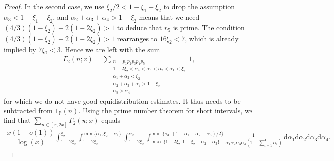 \documentclass{amsart}
\numberwithin{equation}{section}
\begin{document}
\begin{proof}
\medskip
In the second case, we use $\xi_2/2 < 1-\xi_1-\xi_2$ to drop the assumption $\alpha_3 < 1-\xi_1-\xi_2$, and    $\alpha_2+\alpha_3+\alpha_4 > 1-\xi_2$ means that we need $(4/3)(1-\xi_2)+2(1-2\xi_2) >1$
to deduce that $n_5$ is prime. The condition $(4/3)(1-\xi_2)+2(1-2\xi_2) >1$ rearranges to
$  16\xi_2 < 7
$, which is already implied by $ 7 \xi_2 < 3.$ Hence we are left with the sum 
\begin{align}\label{equ:decpart1}
\Gamma_2(n;x)= \sum_{\substack{ n = p_1p_2p_3p_4p_5 \\ 1-2\xi_2 < \alpha_4 < \alpha_3 < \alpha_2 < \alpha_1 < \xi_2 \\ \alpha_1+\alpha_2 <  \xi_2 \\ \alpha_2+\alpha_3 +\alpha_4 > 1-\xi_2 \\ \alpha_5 > \alpha_4}} \!\!\!\!\!\! 1,
\end{align}
for which we do not have good equidistribution estimates. It thus needs to be subtracted from $1_{\mathbb{P}}(n)$. Using the prime number theorem for short intervals, we find that $\sum_{n \in [x,2x]} \Gamma_2(n;x)$ equals 
\begin{align*}
\dfrac{x(1+o(1))}{\log(x)}\int^{\xi_2}_{1 -2\xi_2}\int^{\min\{\alpha_1, \xi_2-\alpha_1\}}_{1 -2\xi_2}\int^{\alpha_2}_{1 -2\xi_2}\int^{\min\{\alpha_3,(1-\alpha_1-\alpha_2-\alpha_3)/2\}}_{\max\{1 -2\xi_2, 1 - \xi_2-\alpha_2-\alpha_3\}} \frac{1}{\alpha_1\alpha_2\alpha_3\alpha_4(1-\sum_{i=1}^4\alpha_i)} \, \mbox{d}\alpha_1 \mbox{d}\alpha_2\mbox{d}\alpha_3\mbox{d}\alpha_4. 
\end{align*}  


\end{proof}
\end{document}
